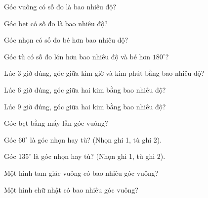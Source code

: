 \begin{ex}
Góc vuông có số đo là bao nhiêu độ?
\end{ex}

\begin{ex}
Góc bẹt có số đo là bao nhiêu độ?
\end{ex}

\begin{ex}
Góc nhọn có số đo bé hơn bao nhiêu độ?
\end{ex}

\begin{ex}
Góc tù có số đo lớn hơn bao nhiêu độ và bé hơn $180^\circ$?
\end{ex}

\begin{ex}
Lúc 3 giờ đúng, góc giữa kim giờ và kim phút bằng bao nhiêu độ?
\end{ex}

\begin{ex}
Lúc 6 giờ đúng, góc giữa hai kim bằng bao nhiêu độ?
\end{ex}

\begin{ex}
Lúc 9 giờ đúng, góc giữa hai kim bằng bao nhiêu độ?
\end{ex}

\begin{ex}
Góc bẹt bằng mấy lần góc vuông?
\end{ex}

\begin{ex}
Góc $60^\circ$ là góc nhọn hay tù? (Nhọn ghi 1, tù ghi 2).
\end{ex}

\begin{ex}
Góc $135^\circ$ là góc nhọn hay tù? (Nhọn ghi 1, tù ghi 2).
\end{ex}

\begin{ex}
Một hình tam giác vuông có bao nhiêu góc vuông?
\end{ex}

\begin{ex}
Một hình chữ nhật có bao nhiêu góc vuông?
\end{ex}

